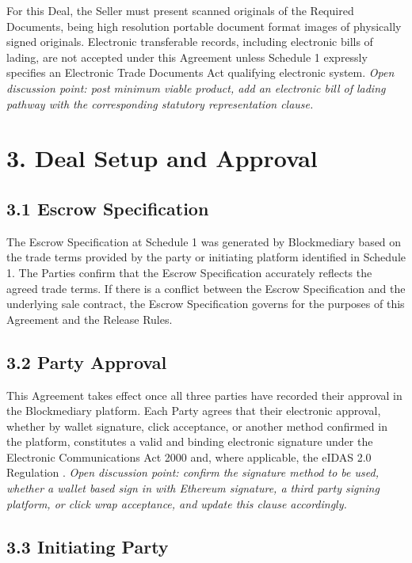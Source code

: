 \documentclass[12pt, a4paper]{article}
\begin{document}
For this Deal, the Seller must present scanned originals of the Required Documents, being
high resolution portable document format images of physically signed originals.
Electronic transferable records, including electronic bills of lading, are not accepted
under this Agreement unless Schedule 1 expressly specifies an Electronic Trade Documents
Act qualifying electronic system. \textit{Open discussion point: post minimum viable
product, add an electronic bill of lading pathway with the corresponding statutory
representation clause.}

\section*{3. Deal Setup and Approval}

\subsection*{3.1 Escrow Specification}

The Escrow Specification at Schedule 1 was generated by Blockmediary based on the trade
terms provided by the party or initiating platform identified in Schedule 1. The Parties
confirm that the Escrow Specification accurately reflects the agreed trade terms. If there
is a conflict between the Escrow Specification and the underlying sale contract, the
Escrow Specification governs for the purposes of this Agreement and the Release Rules.

\subsection*{3.2 Party Approval}

This Agreement takes effect once all three parties have recorded their approval in the
Blockmediary platform. Each Party agrees that their electronic approval, whether by wallet
signature, click acceptance, or another method confirmed in the platform, constitutes a
valid and binding electronic signature under the Electronic Communications Act 2000 and,
where applicable, the eIDAS 2.0 Regulation \citep{ukeca2000, eidas2024}. \textit{Open
discussion point: confirm the signature method to be used, whether a wallet based sign in
with Ethereum signature, a third party signing platform, or click wrap acceptance, and
update this clause accordingly.}

\subsection*{3.3 Initiating Party}
\end{document}
